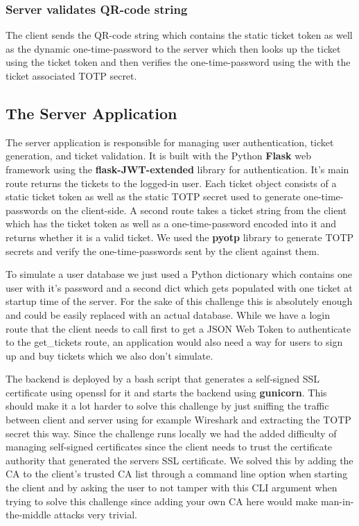 \subsubsection{Server validates QR-code string}
The client sends the QR-code string which contains the static ticket token as well as the dynamic one-time-password to the server which then looks up the ticket using the ticket token and then verifies the one-time-password using the with the ticket associated TOTP secret.


\subsection{The Server Application}
The server application is responsible for managing user authentication, ticket generation, and ticket validation. It is built with the Python \textbf{Flask} web framework using the \textbf{flask-JWT-extended} library for authentication. It's main route returns the tickets to the logged-in user. Each ticket object consists of a static ticket token as well as the static TOTP secret used to generate one-time-passwords on the client-side. A second route takes a ticket string from the client which has the ticket token as well as a one-time-password encoded into it and returns whether it is a valid ticket. We used the \textbf{pyotp} library to generate TOTP secrets and verify the one-time-passwords sent by the client against them.

To simulate a user database we just used a Python dictionary which contains one user with it's password and a second dict which gets populated with one ticket at startup time of the server. For the sake of this challenge this is absolutely enough and could be easily replaced with an actual database. While we have a login route that the client needs to call first to get a JSON Web Token to authenticate to the get\_tickets route, an application would also need a way for users to sign up and buy tickets which we also don't simulate.

The backend is deployed by a bash script that generates a self-signed SSL certificate using openssl for it and starts the backend using \textbf{gunicorn}. This should make it a lot harder to solve this challenge by just sniffing the traffic between client and server using for example Wireshark and extracting the TOTP secret this way. Since the challenge runs locally we had the added difficulty of managing self-signed certificates since the client needs to trust the certificate authority that generated the servers SSL certificate. We solved this by adding the CA to the client's trusted CA list through a command line option when starting the client and by asking the user to not tamper with this CLI argument when trying to solve this challenge since adding your own CA here would make man-in-the-middle attacks very trivial.


